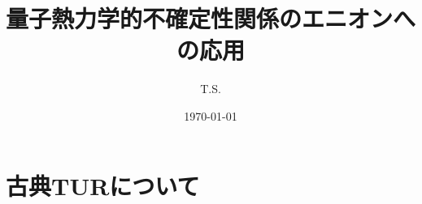 \documentclass[a4paper,11pt]{jsarticle}
\begin{document}
\title{量子熱力学的不確定性関係のエニオンへの応用}
\author{T.S.}
\date{\today}
\maketitle

\section{古典TURについて}
\end{document}
